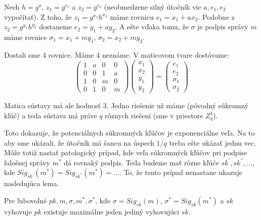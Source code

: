 \begin{dokaz}
Nech $h = g^a$, $z_1 = g^{e_1}$ a $z_2 = g^{e_2}$ 
(neobmedzene silný útočník vie $a, e_1, e_2$ vypočítať).
Z toho, že $z_1 = g^{x_1} h^{x_2}$ máme rovnicu $e_1 = x_1 + ax_2$.
Podobne z $z_2 = g^{y_1} h^{y_2}$ dostaneme $e_2 = y_1 + a y_2$.
A ešte vďaka tomu, že $\sigma$ je podpis správy $m$ máme rovnice
$\sigma_1 = x_1 + my_1$, $\sigma_2 = x_2 + my_2$. 

Dostali sme 4 rovnice. Máme 4 neznáme. V maticovom tvare dostávame:
\begin{equation*}
    \left ( \begin{matrix}
                1 & a & 0 & 0 \\
                0 & 0 & 1 & a \\
                1 & 0 & m & 0 \\
                0 & 1 & 0 & m
            \end{matrix}
    \right )
    \left ( \begin{matrix}
                x_1 \\
                x_2 \\
                y_1 \\
                y_2
            \end{matrix}
    \right )
    =
    \left ( \begin{matrix} 
                e_1 \\
                e_2 \\
                \sigma_1\\
                \sigma_2
            \end{matrix}
    \right )
\end{equation*}

Matica sústavy má ale hodnosť $3$. Jedno riešenie už máme (pôvodný
súkromný kľúč) a teda sústava má práve $q$ rôznych riešení (sme v
priestore $Z_q^4$).

\end{dokaz}

Toto dokazuje, že potenciálnych súkromných kľúčov je exponenciálne veľa.
Na to aby sme ukázali, že útočník má
šancu na úspech $1/q$ treba ešte ukázať jednu vec.
Môže totiž nastať patologický prípad, kde veľa súkromných kľúčov
pri podpise falošnej správy $m^*$ dá rovnaký podpis.
Teda budeme mať rôzne kľúče $sk^{'}, sk^{''}, \dots$,
kde $Sig_{sk^{'}}(m^*) = Sig_{sk^{''}}(m^*) = \dots$.
To, že tento prípad nenastane ukazuje nasledujúca lema.

\begin{lema}
Pre ľubovoľné $pk, m, \sigma, m^*, \sigma^*$, kde $\sigma = Sig_{sk}(m)$, $\sigma^* = Sig_{sk}(m^*)$ a $sk$ vyhovuje $pk$
existuje maximálne jeden jediný vyhovujúci $sk$.
\end{lema}

